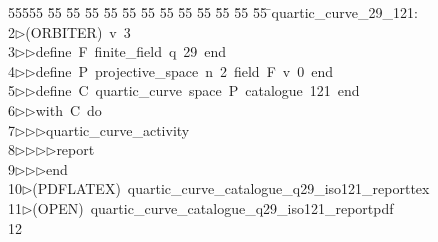 %
%
\begin{tabbing}
55555 \= 55 \= 55 \= 55 \= 55 \= 55 \= 55 \= 55 \= 55 \= 55 \= 55 \= 55 \= 55 \= \>quartic\_curve\_29\_121:\ \\[0pt]
2\>$\triangleright$\>(ORBITER)\ v\ 3\ \\[0pt]
3\>$\triangleright$\>$\triangleright$\>define\ F\ finite\_field\ q\ 29\ end\ \\[0pt]
4\>$\triangleright$\>$\triangleright$\>define\ P\ projective\_space\ n\ 2\ field\ F\ v\ 0\ end\ \\[0pt]
5\>$\triangleright$\>$\triangleright$\>define\ C\ quartic\_curve\ space\ P\ catalogue\ 121\ end\ \\[0pt]
6\>$\triangleright$\>$\triangleright$\>with\ C\ do\ \\[0pt]
7\>$\triangleright$\>$\triangleright$\>$\triangleright$\>quartic\_curve\_activity\ \\[0pt]
8\>$\triangleright$\>$\triangleright$\>$\triangleright$\>$\triangleright$\>report\ \\[0pt]
9\>$\triangleright$\>$\triangleright$\>$\triangleright$\>end\\[0pt]
10\>$\triangleright$\>(PDFLATEX)\ quartic\_curve\_catalogue\_q29\_iso121\_reporttex\\[0pt]
11\>$\triangleright$\>(OPEN)\ quartic\_curve\_catalogue\_q29\_iso121\_reportpdf\\[0pt]
12\>\end{tabbing}
